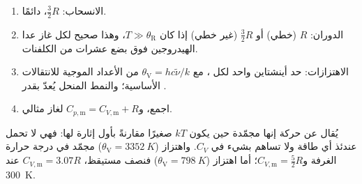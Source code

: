 \begin{method}\label{met:b3:statistical-thermo-applied:cv}
\begin{enumerate}
  \item الانسحاب: $\frac32R$، دائمًا.
  \item الدوران: $R$ (خطي) أو $\frac32R$ (غير خطي) إذا كان $T \gg \theta_{\mathrm R}$، وهذا صحيح لكل
        غاز عدا الهيدروجين فوق بضع عشرات من الكلفنات.
  \item الاهتزازات: حد أينشتاين واحد لكل ، مع $\theta_{\mathrm V} = hc\tilde\nu/k$ من
        الأعداد الموجية للانتقالات الأساسية؛ والنمط المنحل يُعدّ بقدر
        .
  \item اجمع، و$C_{p,\mathrm m} = C_{V,\mathrm m} + R$ لغاز مثالي.
\end{enumerate}
\end{method}

يُقال عن حركة إنها مجمّدة حين يكون $kT$ صغيرًا مقارنةً بأول
إثارة لها: فهي لا تحمل عندئذ أي طاقة ولا تساهم بشيء في $C_V$. 
واهتزاز  ($\theta_{\mathrm V} = \qty{3352}{K}$) مجمّد في درجة حرارة الغرفة 
و$C_{V,\mathrm m} = \frac52R$؛ أما اهتزاز  ($\theta_{\mathrm V} = \qty{798}{K}$) فنصف مستيقظ،
$C_{V,\mathrm m} = 3.07R$ عند \qty{300}{K}.

